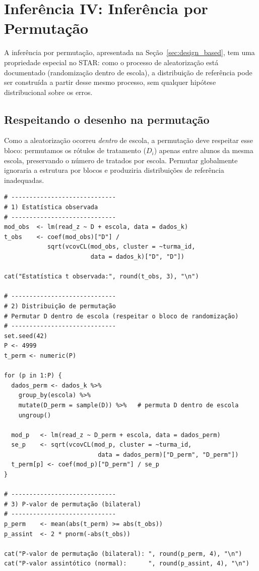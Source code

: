 \section{Inferência IV: Inferência por Permutação}
\label{sec:star_permutacao}

A inferência por permutação, apresentada na Seção~\ref{sec:design_based}, tem uma propriedade especial no STAR: como o processo de aleatorização está documentado (randomização dentro de escola), a distribuição de referência pode ser construída a partir desse mesmo processo, sem qualquer hipótese distribucional sobre os erros.

\subsection*{Respeitando o desenho na permutação}

Como a aleatorização ocorreu \textit{dentro} de escola, a permutação deve respeitar esse bloco: permutamos os rótulos de tratamento ($D_i$) apenas entre alunos da mesma escola, preservando o número de tratados por escola. Permutar globalmente ignoraria a estrutura por blocos e produziria distribuições de referência inadequadas.

\begin{lstlisting}[style=Rstyle, caption={Inferência por permutação com aleatorização em bloco (escola)}]
# -----------------------------
# 1) Estatística observada
# -----------------------------
mod_obs  <- lm(read_z ~ D + escola, data = dados_k)
t_obs    <- coef(mod_obs)["D"] /
            sqrt(vcovCL(mod_obs, cluster = ~turma_id,
                        data = dados_k)["D", "D"])

cat("Estatística t observada:", round(t_obs, 3), "\n")

# -----------------------------
# 2) Distribuição de permutação
# Permutar D dentro de escola (respeitar o bloco de randomização)
# -----------------------------
set.seed(42)
P <- 4999
t_perm <- numeric(P)

for (p in 1:P) {
  dados_perm <- dados_k %>%
    group_by(escola) %>%
    mutate(D_perm = sample(D)) %>%   # permuta D dentro de escola
    ungroup()

  mod_p   <- lm(read_z ~ D_perm + escola, data = dados_perm)
  se_p    <- sqrt(vcovCL(mod_p, cluster = ~turma_id,
                          data = dados_perm)["D_perm", "D_perm"])
  t_perm[p] <- coef(mod_p)["D_perm"] / se_p
}

# -----------------------------
# 3) P-valor de permutação (bilateral)
# -----------------------------
p_perm    <- mean(abs(t_perm) >= abs(t_obs))
p_assint  <- 2 * pnorm(-abs(t_obs))

cat("P-valor de permutação (bilateral): ", round(p_perm, 4), "\n")
cat("P-valor assintótico (normal):      ", round(p_assint, 4), "\n")
\end{lstlisting}

